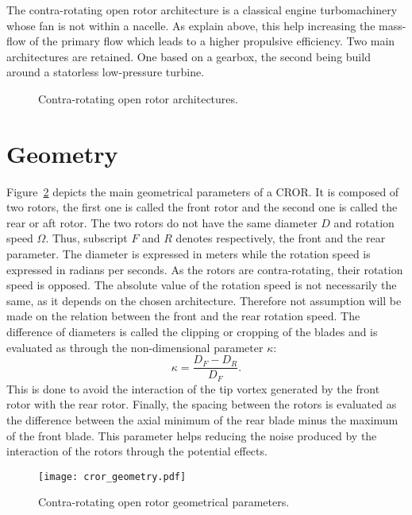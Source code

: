 The contra-rotating open rotor architecture is a classical engine
turbomachinery whose fan is not within a nacelle. As explain
above, this help increasing the mass-flow of the primary flow
which leads to a higher propulsive efficiency.
Two main architectures are retained. One based on a gearbox, the second
being build around a statorless low-pressure turbine.
\begin{figure}[htb]
  \centering
  \caption{Contra-rotating open rotor architectures.}
  \label{fig:ca_cror_designs}
\end{figure}



\section{Geometry}
\label{sec:ca_geometry}

Figure~\ref{fig:ca_cror_geometry} depicts the main
geometrical parameters of a CROR.
It is composed of two rotors, the first one is called
the front rotor and the second one is called the rear or aft rotor.
The two rotors do not have the same diameter $D$ and rotation speed
$\Omega$. Thus, subscript $F$ and $R$ denotes respectively,
the front and the rear parameter. The diameter is expressed in meters
while the rotation speed is expressed in radians per seconds.
As the rotors are contra-rotating, their rotation speed is opposed.
The absolute value of the rotation speed is not necessarily the same,
as it depends on the chosen architecture. Therefore not assumption
will be made on the relation between the front and the rear
rotation speed.
The difference of diameters is called the clipping or cropping
of the blades and is evaluated as through the non-dimensional parameter
$\kappa$:
\begin{equation}
    \kappa = \frac{D_F - D_R}{D_F}.
\end{equation}
This is done to avoid the interaction of the tip vortex generated
by the front rotor with the rear rotor.
Finally, the spacing between the rotors
is evaluated as the difference between the axial minimum of the
rear blade minus the maximum of the front blade. This parameter
helps reducing the noise produced by the interaction of
the rotors through the potential effects.
\begin{figure}[htbp]
  \centering
  \texttt{[image: cror\_geometry.pdf]}
  \caption{Contra-rotating open rotor geometrical parameters.}
  \label{fig:ca_cror_geometry}
\end{figure}

